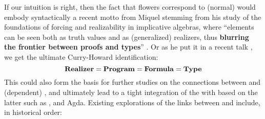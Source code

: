 If our intuition is right, then the fact that flowers correspond to (normal)
 would embody syntactically a recent motto from Miquel stemming
from his study of the foundations of forcing and realizability in implicative
algebras, where ``elements can be seen both as truth values and as (generalized)
realizers, thus \textbf{blurring the frontier between proofs and
types}'' . Or as he put it in a
recent talk \cite{miquel_implicative_topos_2022}, we get the ultimate
Curry-Howard identification:
$$
\text{\textbf{Realizer}} = \text{\textbf{Program}} = \text{\textbf{Formula}} = \text{\textbf{Type}}
$$
This could also form the basis for further studies on the connections between 
and (dependent) , and ultimately lead to a tight integration of the
 with  based on the latter such as ,  and
Agda. Existing explorations of the links between  and 
include, in historical order:
